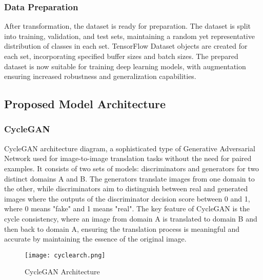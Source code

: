 \documentclass[conference]{IEEEtran}
\begin{document}
\subsubsection{Data Preparation}
After transformation, the dataset is ready for preparation. The dataset is split into training, validation, and test sets, maintaining a random yet representative distribution of classes in each set. TensorFlow Dataset objects are created for each set, incorporating specified buffer sizes and batch sizes. The prepared dataset is now suitable for training deep learning models, with augmentation ensuring increased robustness and generalization capabilities.

\subsection{Proposed Model Architecture}
\subsubsection{CycleGAN}
CycleGAN architecture diagram, a sophisticated type of Generative Adversarial Network used for image-to-image translation tasks without the need for paired examples. It consists of two sets of models: discriminators and generators for two distinct domains A and B. The generators translate images from one domain to the other, while discriminators aim to distinguish between real and generated images where the outputs of the discriminator decision score between 0 and 1, where 0 means "fake" and 1 means "real". The key feature of CycleGAN is the cycle consistency, where an image from domain A is translated to domain B and then back to domain A, ensuring the translation process is meaningful and accurate by maintaining the essence of the original image.

\begin{figure}[!ht]
  \centering
  \texttt{[image: cyclearch.png]}
  \captionsetup{justification=centering}
  \caption{CycleGAN Architecture}
  \label{fig:CycleGAN Architecture}
\end{figure}
\end{document}
